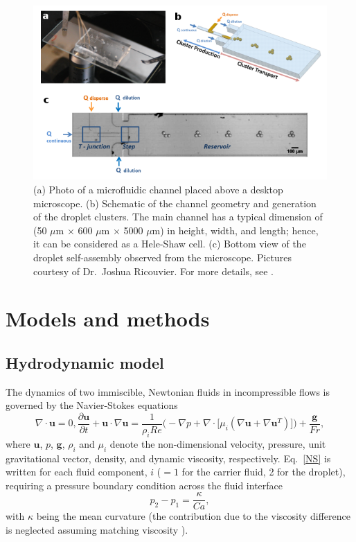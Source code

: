 \begin{figure}[t]
 \centering
 \includegraphics[width=0.9\columnwidth]{figs/microfluidic_channel.png}
 \caption{(a) Photo of a microfluidic channel placed above a desktop microscope. (b) Schematic of the channel geometry and generation of the droplet clusters. The main channel has a typical dimension of (50 $\mu$m $\times$ 600 $\mu$m $\times$ 5000 $\mu$m) in height, width, and length; hence, it can be considered as a Hele-Shaw cell. (c) Bottom view of the droplet self-assembly observed from the microscope. Pictures courtesy of Dr.\ Joshua Ricouvier. For more details, see   \cite{Shen_2016AS}.}
 \label{fig: chip}
\end{figure}


\section{Models and methods} \label{model}

\subsection{Hydrodynamic model}

The dynamics of two immiscible, Newtonian fluids in incompressible flows is governed by the Navier-Stokes equations
\begin{subequations}
 \begin{equation}
   \nabla \cdot {\bm u} = 0,
  \label{div free}
 \end{equation}
 \begin{equation}
      \frac{\partial {\bm u}}{\partial t} + {\bm u} \cdot \nabla {\bm u} = \frac{1}{\rho_iRe} \bigg(-\nabla p + \nabla \cdot \big[ \mu_i ( \nabla {\bm u} + \nabla {\bm u}^T ) \big] \bigg) + \frac{{\bm g}}{Fr},
  \label{NS}
 \end{equation}
\end{subequations}
where ${\bm u}$, $p$, $\bm{g}$, $\rho_i$ and $\mu_i$ denote the non-dimensional velocity, pressure, unit gravitational vector, density, and dynamic viscosity, respectively. Eq.\ \eqref{NS} is written for each fluid component, $i$ ($=1$ for the carrier fluid, 2 for the droplet), requiring a pressure boundary condition across the fluid interface
\begin{equation}
  p_2 - p_1 = \frac{\kappa}{Ca},
  \label{p laplace}
\end{equation}
with $\kappa$ being the mean curvature (the contribution due to the viscosity difference is neglected assuming matching viscosity \cite{Batchelor}).

